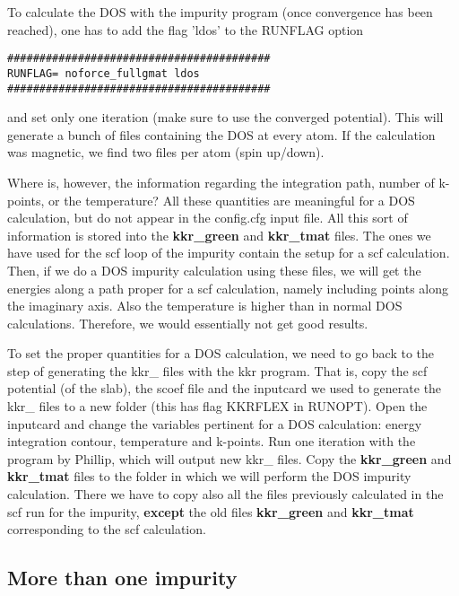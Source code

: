 \documentclass[11pt,fleqn]{book} %
\begin{document}
To calculate the DOS with the impurity program (once convergence has been reached),
one has to add the flag 'ldos' to the RUNFLAG option
\begin{VBox}
\begin{verbatim}
#########################################
RUNFLAG= noforce_fullgmat ldos
#########################################
\end{verbatim}
\end{VBox}
and set only one iteration (make sure to use the converged potential).
This will generate a bunch of files containing the DOS
at every atom. If the calculation was magnetic, we find two
files per atom (spin up/down).

Where is, however, the information regarding the integration path, number of k-points,
or the temperature? All these quantities are meaningful for a DOS calculation,
but do not appear in the config.cfg input file. All this sort of information
is stored into the \textbf{kkr\_green} and \textbf{kkr\_tmat} files.
The ones we have used for the scf loop of the impurity contain the setup for a
scf calculation. Then, if we do a DOS impurity calculation using these files, we
will get the energies along a path proper for a scf calculation, namely including points along
the imaginary axis. Also the temperature is higher than in normal DOS calculations.
Therefore, we would essentially not get good results.

To set the proper quantities for a DOS calculation, we need to go back to the
step of generating the kkr\_ files with the kkr program.
That is, copy the scf potential (of the slab), the scoef file and the inputcard
we used to generate the kkr\_ files to a new folder (this has flag KKRFLEX in RUNOPT).
Open the inputcard and change the variables pertinent for a DOS calculation:
energy integration contour, temperature and k-points. Run
one iteration with the program by Phillip, which will output
new kkr\_ files. Copy the \textbf{kkr\_green} and \textbf{kkr\_tmat} files
to the folder in which we will perform the DOS impurity calculation.
There we have to copy also all the files previously calculated in the scf
run for the impurity, \textbf{except} the old files \textbf{kkr\_green} and \textbf{kkr\_tmat}
corresponding to the scf calculation.

\subsection{More than one impurity}
\end{document}
